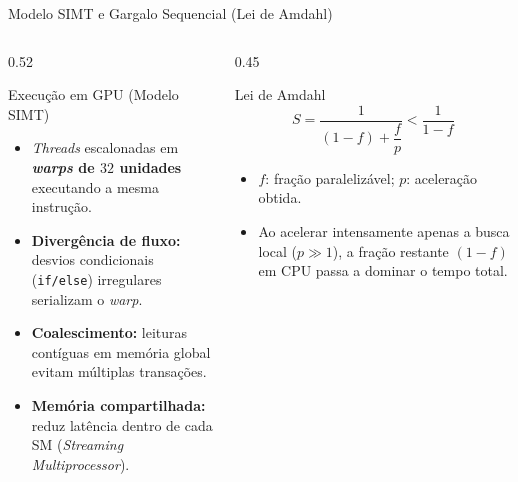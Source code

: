 \begin{frame}{Modelo SIMT e Gargalo Sequencial (Lei de Amdahl)}
  \begin{columns}[T,onlytextwidth]
    \begin{column}{0.52\textwidth}
      \begin{block}{Execução em GPU (Modelo SIMT) \autocite{nvidia2024cuda}}
        \begin{itemize}
          \item \emph{Threads} escalonadas em \textbf{\emph{warps} de $32$ unidades} executando a mesma instrução.
          \item \textbf{Divergência de fluxo:} desvios condicionais (\texttt{if/else}) irregulares serializam o \emph{warp}.
          \item \textbf{Coalescimento:} leituras contíguas em memória global evitam múltiplas transações.
          \item \textbf{Memória compartilhada:} reduz latência dentro de cada SM (\emph{Streaming Multiprocessor}).
        \end{itemize}
      \end{block}
    \end{column}
    \begin{column}{0.45\textwidth}
      \begin{alertblock}{Lei de Amdahl \autocite{amdahl1967validity}}
        \[
          S = \frac{1}{(1 - f) + \dfrac{f}{p}} < \frac{1}{1 - f}
        \]
        \begin{itemize}
          \item $f$: fração paralelizável; $p$: aceleração obtida.
          \item Ao acelerar intensamente apenas a busca local ($p \gg 1$), a fração restante $(1 - f)$ em CPU passa a dominar o tempo total.
        \end{itemize}
      \end{alertblock}
    \end{column}
  \end{columns}
\end{frame}

